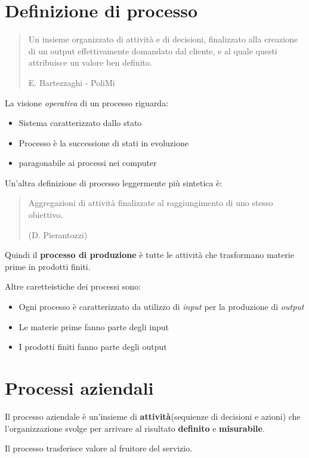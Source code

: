 \section{Definizione di processo}
\begin{quote}
  Un insieme organizzato di attività e di
  decisioni, finalizzato alla creazione di
  un output effettivamente domandato
  dal cliente, e al quale questi attribuisce
  un valore ben definito.

  E. Bartezzaghi - PoliMi
\end{quote}


La visione \textit{operativa} di un processo riguarda:
\begin{itemize}
  \item Sistema caratterizzato dallo stato
  \item Processo è la successione di stati in evoluzione
  \item paragonabile ai processi nei computer
\end{itemize}

Un'altra definizione di processo leggermente più sintetica è:
\begin{quote}
  Aggregazioni di attività finalizzate al raggiungimento di uno stesso obiettivo.

  (D. Pierantozzi)
\end{quote}

Quindi il \textbf{processo di produzione} è tutte le attività che trasformano materie prime
in prodotti finiti.


Altre caretteistiche dei processi sono:
\begin{itemize}
  \item Ogni processo è caratterizzato da utilizzo di  \textit{input} per la
    produzione di \textit{output}
  \item Le materie prime fanno parte degli input
  \item I prodotti finiti fanno parte degli output
\end{itemize}


\section{Processi aziendali}

Il processo aziendale è un'insieme di \textbf{attività}(sequienze di decisioni e azioni)
che l'organizzazione svolge per arrivare al risultato \textbf{definito} e \textbf{misurabile}.

Il processo trasferisce valore al fruitore del servizio.

